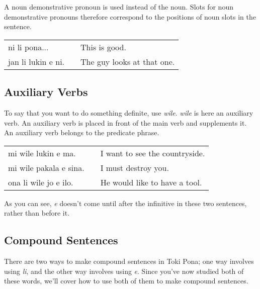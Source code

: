 A noun demonstrative pronoun is used instead of the noun. 
Slots for noun demonstrative pronouns therefore correspond to the positions of noun slots in the sentence. 

\begin{supertabular}{p{5,5cm}|ll}
ni li pona... && This is good. \\
jan li lukin e ni. && The guy looks at that one. \\
\end{supertabular}


%
{}
\subsection*{Auxiliary Verbs}
%
To say that you want to do something definite, use \textit{wile}.
\textit{wile} is here an auxiliary verb. 
An auxiliary verb is placed in front of the main verb and supplements it. 
An auxiliary verb belongs to the predicate phrase. 

\begin{supertabular}{p{5,5cm}|ll}
mi wile lukin e ma. && I want to see the countryside. \\
mi wile pakala e sina. && I must destroy you. \\
ona li wile jo e ilo. && He would like to have a tool. \\
\end{supertabular} 

As you can see, \textit{e} doesn't come until after the infinitive in these two sentences, rather than before it. 

{}
\label{'multiple_li'}
\subsection*{Compound Sentences}
%
There are two ways to make compound sentences in Toki Pona; one way involves using \textit{li}, and the other way involves using \textit{e}. 
Since you've now studied both of these words, we'll cover how to use both of them to make compound sentences. 


